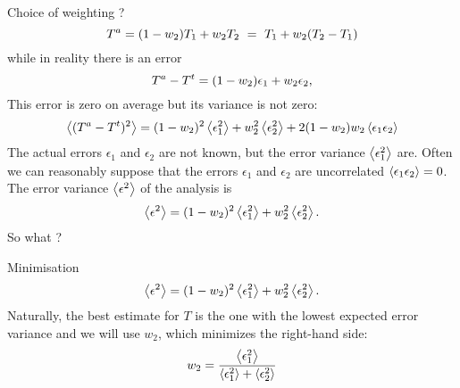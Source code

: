 \begin{frame}{Choice of weighting ?}
\begin{equation}
{T}^a = (1-w_2) T_1 + w_2 T_2  ~=~ T_1 + w_2 (T_2-T_1)
\end{equation}
while in reality there is an error
\begin{equation}
{T}^a - {T}^t = (1-w_2) \epsilon_1 + w_2 \epsilon_2,
\end{equation}
This error is zero on average but its variance is not zero:
\begin{equation}
\left\langle ({T}^a-{T}^t)^2 \right\rangle = (1-w_2)^2 \left\langle \epsilon_1^2 \right\rangle + w_2^2 \left\langle \epsilon_2^2 \right\rangle + 2 (1-w_2) w_2 
\left\langle \epsilon_1 \epsilon_2 \right\rangle
\end{equation}
The actual errors $\epsilon_1$ and $\epsilon_2$ are not known, but the error variance $\left\langle \epsilon_1^2 \right\rangle$ are.
Often we can reasonably suppose that the errors
$\epsilon_1$ and $\epsilon_2$ are uncorrelated $\left\langle \epsilon_1 \epsilon_2 \right\rangle=0$. 
The error variance $\left\langle \epsilon^2 \right\rangle$ of the analysis is
\begin{equation}
\left\langle \epsilon^2 \right\rangle=(1-w_2)^2 \left\langle \epsilon_1^2 \right\rangle + w_2^2 \left\langle \epsilon_2^2 \right\rangle.
\label{eq:epsilonerror}
\end{equation}
So what ?
\end{frame}


\begin{frame}{Minimisation}
\begin{equation}
\left\langle \epsilon^2 \right\rangle=(1-w_2)^2 \left\langle \epsilon_1^2 \right\rangle + w_2^2 \left\langle \epsilon_2^2 \right\rangle.
\label{eq:epsilonerror}
\end{equation}
Naturally, the best estimate for $T$ is the one with the lowest expected error variance and we will use $w_2$, which minimizes
the right-hand side:
\begin{equation}
w_2 = \frac{\left\langle \epsilon_1^2 \right\rangle}{\left\langle \epsilon_1^2 \right\rangle+\left\langle \epsilon_2^2 \right\rangle}
\label{eq:weighterror}
\end{equation}
\end{frame}

